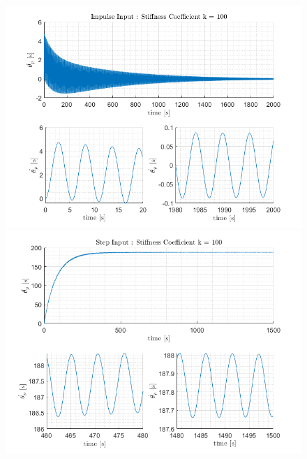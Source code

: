 \documentclass[letterpaper,12pt]{article}
\begin{document}
\begin{figure}[ht]
    \centering
    \includegraphics[scale = .8]{Images/Impulse_k100.png}
    \includegraphics[scale = .8]{Images/StepInput_k100.png}
\end{figure}
\end{document}
